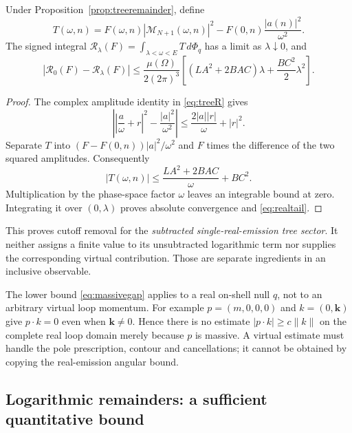 \begin{theorem}\label{thm:realtail}
Under Proposition~\ref{prop:treeremainder}, define
\[
 T(\omega,n)=F(\omega,n)|\mathcal M_{N+1}(\omega,n)|^2
            -F(0,n)\frac{|a(n)|^2}{\omega^2}.
\]
The signed integral $\mathcal R_\lambda(F)=\int_{\lambda<\omega<E}T\,d\Phi_q$ has a limit as $\lambda\downarrow0$, and
\begin{equation}\label{eq:realtail}
 |\mathcal R_0(F)-\mathcal R_\lambda(F)|
 \le \frac{\mu(\Omega)}{2(2\pi)^3}
 \left[(LA^2+2BAC)\lambda+\frac{BC^2}{2}\lambda^2\right].
\end{equation}
\end{theorem}
\begin{proof}
The complex amplitude identity in \eqref{eq:treeR} gives
\[
 \left|\left|\frac a\omega+r\right|^2-\frac{|a|^2}{\omega^2}\right|
 \le\frac{2|a||r|}{\omega}+|r|^2.
\]
Separate $T$ into $(F-F(0,n))|a|^2/\omega^2$ and $F$ times the difference of the two squared amplitudes. Consequently
\[
 |T(\omega,n)|\le \frac{LA^2+2BAC}{\omega}+BC^2.
\]
Multiplication by the phase-space factor $\omega$ leaves an integrable bound at zero. Integrating it over $(0,\lambda)$ proves absolute convergence and \eqref{eq:realtail}.
\end{proof}

This proves cutoff removal for the \emph{subtracted single-real-emission tree sector}. It neither assigns a finite value to its unsubtracted logarithmic term nor supplies the corresponding virtual contribution. Those are separate ingredients in an inclusive observable.

The lower bound \eqref{eq:massivegap} applies to a real on-shell null $q$, not to an arbitrary virtual loop momentum. For example $p=(m,0,0,0)$ and $k=(0,\boldsymbol k)$ give $p\cdot k=0$ even when $\boldsymbol k\ne0$. Hence there is no estimate $|p\cdot k|\ge c\|k\|$ on the complete real loop domain merely because $p$ is massive. A virtual estimate must handle the pole prescription, contour and cancellations; it cannot be obtained by copying the real-emission angular bound.

\subsection{Logarithmic remainders: a sufficient quantitative bound}

